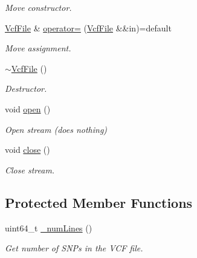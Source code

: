 \begin{DoxyCompactItemize}
\begin{DoxyCompactList}\small\item\em Move constructor. \end{DoxyCompactList}\item 
\mbox{\label{classvarfiles_1_1_vcf_file_a3b2f35c24bc912819010d2961cda29ee}} 
\hyperlink{classvarfiles_1_1_vcf_file}{Vcf\+File} \& \hyperlink{classvarfiles_1_1_vcf_file_a3b2f35c24bc912819010d2961cda29ee}{operator=} (\hyperlink{classvarfiles_1_1_vcf_file}{Vcf\+File} \&\&in)=default
\begin{DoxyCompactList}\small\item\em Move assignment. \end{DoxyCompactList}\item 
\mbox{\label{classvarfiles_1_1_vcf_file_a95e6e9273f5e92b763c7f248640a94a2}} 
\hyperlink{classvarfiles_1_1_vcf_file_a95e6e9273f5e92b763c7f248640a94a2}{$\sim$\+Vcf\+File} ()
\begin{DoxyCompactList}\small\item\em Destructor. \end{DoxyCompactList}\item 
\mbox{\label{classvarfiles_1_1_vcf_file_a02343915a34d18b346885c260409e6ae}} 
void \hyperlink{classvarfiles_1_1_vcf_file_a02343915a34d18b346885c260409e6ae}{open} ()
\begin{DoxyCompactList}\small\item\em Open stream (does nothing) \end{DoxyCompactList}\item 
\mbox{\label{classvarfiles_1_1_vcf_file_a42acb5069085bdab92e26257b7cd7e47}} 
void \hyperlink{classvarfiles_1_1_vcf_file_a42acb5069085bdab92e26257b7cd7e47}{close} ()
\begin{DoxyCompactList}\small\item\em Close stream. \end{DoxyCompactList}\end{DoxyCompactItemize}
\subsection*{Protected Member Functions}
\begin{DoxyCompactItemize}
\item 
uint64\+\_\+t \hyperlink{classvarfiles_1_1_vcf_file_aaafc33a691977c8f60c9b129c920ee76}{\+\_\+num\+Lines} ()
\begin{DoxyCompactList}\small\item\em Get number of S\+N\+Ps in the V\+CF file. \end{DoxyCompactList}\end{DoxyCompactItemize}
